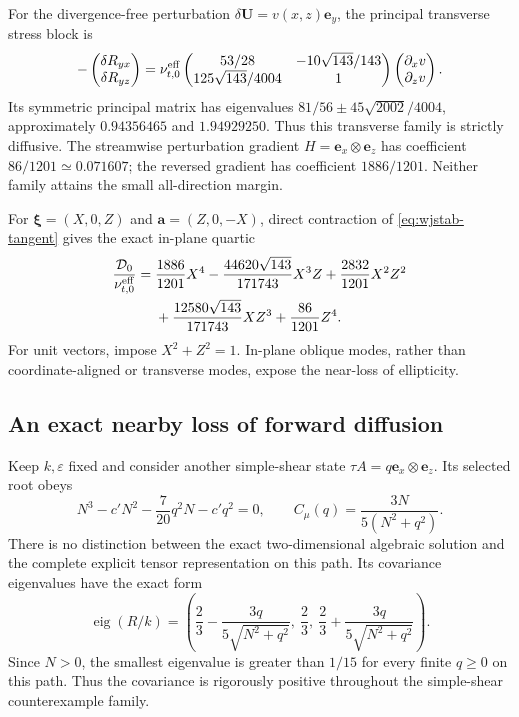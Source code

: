 \documentclass[11pt,a4paper]{article}
\numberwithin{equation}{section}
\begin{document}
For the divergence-free perturbation
$\delta\boldsymbol U=v(x,z)\boldsymbol e_y$, the principal transverse
stress block is
\begin{equation}
 -\begin{pmatrix}\delta R_{yx}\\\delta R_{yz}\end{pmatrix}
 =\nu_{t,0}^{\rm eff}
 \begin{pmatrix}53/28&-10\sqrt{143}/143\\
                 125\sqrt{143}/4004&1\end{pmatrix}
 \begin{pmatrix}\partial_xv\\\partial_zv\end{pmatrix}.
 \label{eq:wjstab-transverse-block}
\end{equation}
Its symmetric principal matrix has eigenvalues
$81/56\pm45\sqrt{2002}/4004$, approximately $0.94356465$ and
$1.94929250$. Thus this transverse family is strictly diffusive.
The streamwise perturbation gradient $H=\boldsymbol e_x\otimes
\boldsymbol e_z$ has coefficient $86/1201\simeq0.071607$;
the reversed gradient has coefficient $1886/1201$. Neither family
attains the small all-direction margin.

For $\boldsymbol\xi=(X,0,Z)$ and
$\boldsymbol a=(Z,0,-X)$, direct contraction of
\eqref{eq:wjstab-tangent} gives the exact in-plane quartic
\begin{align}
 \frac{\mathcal D_0}{\nu_{t,0}^{\rm eff}}
 ={}&\frac{1886}{1201}X^4
 -\frac{44620\sqrt{143}}{171743}X^3Z
 +\frac{2832}{1201}X^2Z^2\nonumber\\
 &+\frac{12580\sqrt{143}}{171743}XZ^3
 +\frac{86}{1201}Z^4.
 \label{eq:wjstab-reference-quartic}
\end{align}
For unit vectors, impose $X^2+Z^2=1$. In-plane oblique modes, rather
than coordinate-aligned or transverse modes, expose the near-loss of
ellipticity.

\subsection{An exact nearby loss of forward diffusion}

Keep $k,\varepsilon$ fixed and consider another simple-shear state
$\tau A=q\boldsymbol e_x\otimes\boldsymbol e_z$. Its selected root
obeys
\begin{equation}
 N^3-c'N^2-\frac7{20}q^2N-c'q^2=0,
 \qquad C_\mu(q)=\frac{3N}{5(N^2+q^2)}.
 \label{eq:wjstab-shear-root}
\end{equation}
There is no distinction between the exact two-dimensional algebraic
solution and the complete explicit tensor representation on this path.
Its covariance eigenvalues have the exact form
\begin{equation}
 \operatorname{eig}(R/k)=\left(
 \frac23-\frac{3q}{5\sqrt{N^2+q^2}},\ \frac23,\
 \frac23+\frac{3q}{5\sqrt{N^2+q^2}}\right).
 \label{eq:wjstab-shear-eigenvalues}
\end{equation}
Since $N>0$, the smallest eigenvalue is greater than $1/15$ for
every finite $q\geq0$ on this path. Thus the covariance is rigorously
positive throughout the simple-shear counterexample family.
\end{document}
